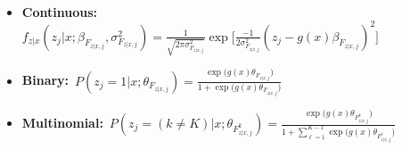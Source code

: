 \documentclass[12pt, aspectratio=169]{beamer}
\begin{document}
\begin{frame}[label=fwdp2]
\begin{multline*}
\end{multline*}
\vspace{-15pt}
\small
\begin{itemize}
\item \textbf{Continuous:}\ \scriptsize $f_{z|x}(z_j|x;\beta_{F_{z|x,j}},\sigma^2_{F_{z|x,j}}) = \frac{1}{\sqrt{2\pi\sigma^2_{F_{z|x,j}}}}\exp\Big[\frac{-1}{2\sigma^2_{F_{z|x,j}}}(z_j-g(x)\beta_{F_{z|x,j}})^2\Big]$ \small
\vspace{-10pt}
\item \textbf{Binary:}\ \scriptsize $P(z_j=1|x;\theta_{F_{z|x,j}}) = \frac{\exp\big(g(x)\theta_{F_{z|x,j}}\big)}{1+\exp\big(g(x)\theta_{F_{z|x,j}}\big)}$ \small
\vspace{-10pt}
\item \textbf{Multinomial:}\ \tiny $P(z_j=(k\neq K)|x;\theta_{F_{z|x,j}^k}) = \frac{\exp\Big(g(x)\theta_{F_{z|x,j}^k}\Big)}{1+\sum_{\ell=1}^{K-1}\exp\Big(g(x)\theta_{F_{z|x,j}^\ell}\Big)}$
\vspace{-10pt}
\end{itemize}
\hyperlink{wmo}{}
\end{frame}
\end{document}
